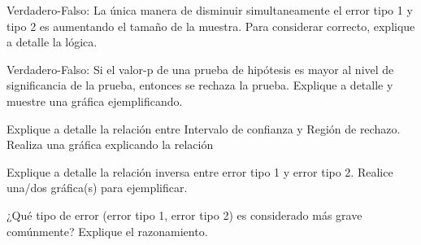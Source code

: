 \documentclass[addpoints]{exam}
\theoremstyle{mytheor}
\begin{document}
  \begin{questions}
  
  \question Verdadero-Falso: La única manera de disminuir simultaneamente el error tipo 1 y tipo 2 es aumentando el tamaño de la muestra. Para considerar correcto, explique a detalle la lógica. 
  
   \question Verdadero-Falso: Si el valor-p de una prueba de hipótesis es mayor al nivel de significancia de la prueba, entonces se rechaza la prueba. Explique a detalle y muestre una gráfica ejemplificando.
   
   \question Explique a detalle la relación entre Intervalo de confianza y Región de rechazo. Realiza una gráfica explicando la relación
   
   \question Explique a detalle la relación inversa entre error tipo 1 y error tipo 2. Realice una/dos gráfica(s) para ejemplificar.
   
   \question ¿Qué tipo de error (error tipo 1, error tipo 2) es considerado más grave comúnmente? Explique el razonamiento.
   
   \end{questions}
 
  
\end{document}
